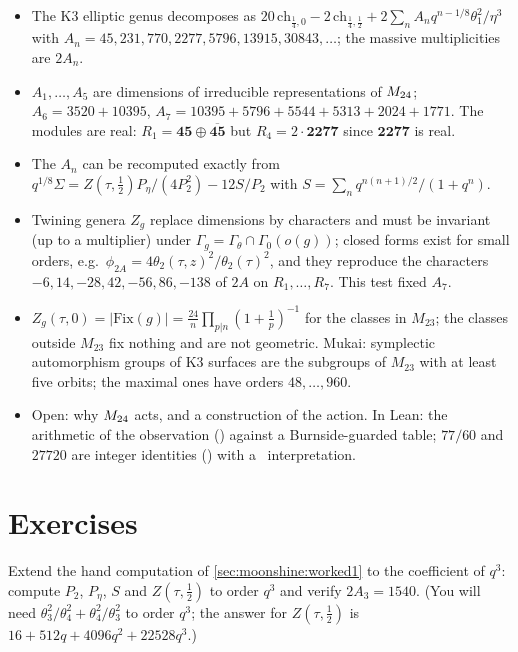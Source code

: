 \begin{summarybox}
\begin{itemize}[leftmargin=*]
\item The K3 elliptic genus decomposes as $20\,\mathrm{ch}_{\frac14,0}-2\,\mathrm{ch}_{\frac14,\frac12}
  +2\sum_nA_nq^{n-1/8}\theta_1^2/\eta^3$ with $A_n=45,231,770,2277,5796,13915,30843,\dots$;
  the massive multiplicities are $2A_n$.
\item $A_1,\dots,A_5$ are dimensions of irreducible representations of $M_{24}$;
  $A_6=3520+10395$, $A_7=10395+5796+5544+5313+2024+1771$. The modules are real:
  $R_1=\mathbf{45}\oplus\overline{\mathbf{45}}$ but $R_4=2\cdot\mathbf{2277}$ since
  $\mathbf{2277}$ is real.
\item The $A_n$ can be recomputed exactly from $q^{1/8}\Sigma=Z(\tau,\tfrac12)P_\eta/(4P_2^2)
  -12S/P_2$ with $S=\sum_nq^{n(n+1)/2}/(1+q^n)$.
\item Twining genera $Z_g$ replace dimensions by characters and must be invariant (up to
  a multiplier) under $\Gamma_g=\Gamma_\theta\cap\Gamma_0(o(g))$; closed forms exist for
  small orders, e.g.\ $\phi_{2A}=4\theta_2(\tau,z)^2/\theta_2(\tau)^2$, and they reproduce
  the characters $-6,14,-28,42,-56,86,-138$ of $2A$ on $R_1,\dots,R_7$. This test fixed $A_7$.
\item $Z_g(\tau,0)=|\mathrm{Fix}(g)|=\frac{24}{n}\prod_{p|n}(1+\tfrac1p)^{-1}$ for the classes
  in $M_{23}$; the classes outside $M_{23}$ fix nothing and are not geometric. Mukai:
  symplectic automorphism groups of K3 surfaces are the subgroups of $M_{23}$ with at
  least five orbits; the maximal ones have orders $48,\dots,960$.
\item Open: why $M_{24}$ acts, and a construction of the action. In Lean: the arithmetic of
  the observation (\TA) against a Burnside-guarded table; $77/60$ and $27720$ are integer
  identities (\TA) with a \TC\ interpretation.
\end{itemize}
\end{summarybox}

\section*{Exercises}

\begin{exercise}[$\star$]\label{exo:moonshine:hand}
Extend the hand computation of \cref{sec:moonshine:worked1} to the coefficient of $q^3$:
compute $P_2$, $P_\eta$, $S$ and $Z(\tau,\tfrac12)$ to order $q^3$ and verify
$2A_3=1540$. (You will need $\theta_3^2/\theta_4^2+\theta_4^2/\theta_3^2$ to order $q^3$;
the answer for $Z(\tau,\tfrac12)$ is $16+512q+4096q^2+22528q^3$.)
\end{exercise}

